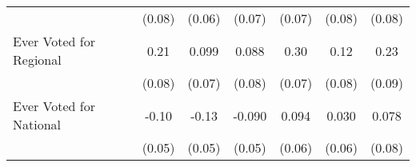 {\begin{tabular}{l*{6}{c}}
            &      (0.08)         &      (0.06)         &      (0.07)         &      (0.07)         &      (0.08)         &      (0.08)         \\
\addlinespace
Ever Voted for Regional&        0.21\sym{**} &       0.099         &       0.088         &        0.30\sym{***}&        0.12         &        0.23\sym{**} \\
            &      (0.08)         &      (0.07)         &      (0.08)         &      (0.07)         &      (0.08)         &      (0.09)         \\
\addlinespace
Ever Voted for National&       -0.10\sym{*}  &       -0.13\sym{**} &      -0.090         &       0.094         &       0.030         &       0.078         \\
            &      (0.05)         &      (0.05)         &      (0.05)         &      (0.06)         &      (0.06)         &      (0.08)         \\
\bottomrule
\end{tabular}
}
